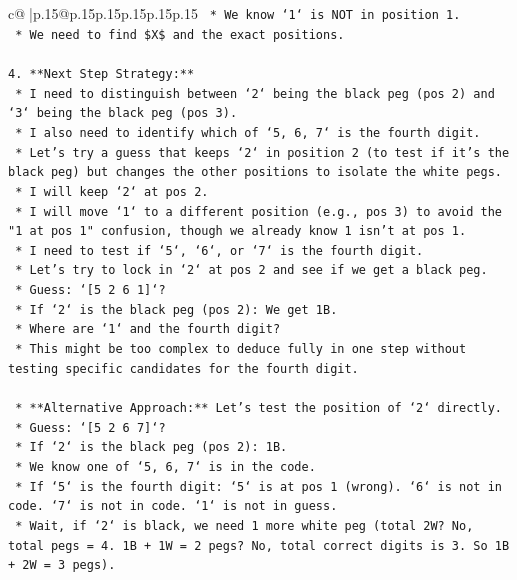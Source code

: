\documentclass{article}
\begin{document}
{\begin{supertabular}{c@{$\;$}|p{.15\linewidth}@{}p{.15\linewidth}p{.15\linewidth}p{.15\linewidth}p{.15\linewidth}p{.15\linewidth}}
{{{\texttt{    *   We know `1` is NOT in position 1.} \\
\texttt{    *   We need to find \$X\$ and the exact positions.} \\
\\ 
\texttt{4.  **Next Step Strategy:**} \\
\texttt{    *   I need to distinguish between `2` being the black peg (pos 2) and `3` being the black peg (pos 3).} \\
\texttt{    *   I also need to identify which of `5, 6, 7` is the fourth digit.} \\
\texttt{    *   Let's try a guess that keeps `2` in position 2 (to test if it's the black peg) but changes the other positions to isolate the white pegs.} \\
\texttt{    *   I will keep `2` at pos 2.} \\
\texttt{    *   I will move `1` to a different position (e.g., pos 3) to avoid the "1 at pos 1" confusion, though we already know 1 isn't at pos 1.} \\
\texttt{    *   I need to test if `5`, `6`, or `7` is the fourth digit.} \\
\texttt{    *   Let's try to lock in `2` at pos 2 and see if we get a black peg.} \\
\texttt{    *   Guess: `{[}5 2 6 1{]}`?} \\
\texttt{        *   If `2` is the black peg (pos 2): We get 1B.} \\
\texttt{        *   Where are `1` and the fourth digit?} \\
\texttt{        *   This might be too complex to deduce fully in one step without testing specific candidates for the fourth digit.} \\
\\ 
\texttt{    *   **Alternative Approach:** Let's test the position of `2` directly.} \\
\texttt{    *   Guess: `{[}5 2 6 7{]}`?} \\
\texttt{        *   If `2` is the black peg (pos 2): 1B.} \\
\texttt{        *   We know one of `5, 6, 7` is in the code.} \\
\texttt{        *   If `5` is the fourth digit: `5` is at pos 1 (wrong). `6` is not in code. `7` is not in code. `1` is not in guess.} \\
\texttt{        *   Wait, if `2` is black, we need 1 more white peg (total 2W? No, total pegs = 4. 1B + 1W = 2 pegs? No, total correct digits is 3. So 1B + 2W = 3 pegs).} \\
}}}
\end{supertabular}}
\end{document}
